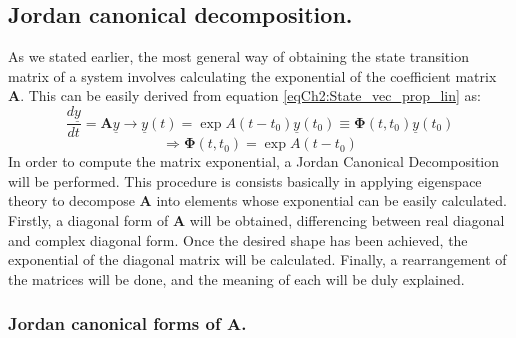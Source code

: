 	\subsection{Jordan canonical decomposition.}
	\indent As we stated earlier, the most general way of obtaining the state transition matrix of a system involves calculating the exponential of the coefficient matrix $\bm A$. This can be easily derived from equation \eqref{eqCh2:State_vec_prop_lin} as:
	\[ 
	\dfrac{d\underline{y}}{dt} = \bm A \underline{y} \rightarrow \underline{y}(t) = \exp A(t -t_0) \underline{y}(t_0) \equiv \bm \Phi (t, t_0) \underline{y}(t_0) 
	\]
	\begin{equation}
	\Rightarrow \bm \Phi (t, t_0) = \exp A(t -t_0)
	\end{equation}
	\indent In order to compute the matrix exponential, a Jordan Canonical Decomposition will be performed. This procedure is consists basically in applying eigenspace theory to decompose $\bm A$ into elements whose exponential can be easily calculated. Firstly, a diagonal form of $\bm A$ will be obtained, differencing between real diagonal and complex diagonal form. Once the desired shape has been achieved, the exponential of the diagonal matrix will be calculated. Finally, a rearrangement of the matrices will be done, and the meaning of each will be duly explained.
		\subsubsection{Jordan canonical forms of $\bm A$.}
